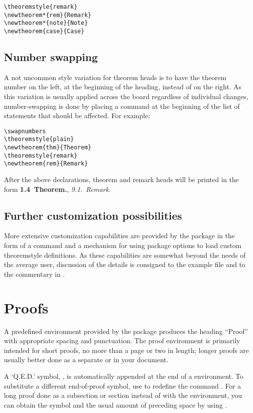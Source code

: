 \documentclass[leqno,titlepage,openany]{amsldoc}
\begin{document}
\begin{verbatim}
\theoremstyle{remark}
\newtheorem*{rem}{Remark}
\newtheorem*{note}{Note}
\newtheorem{case}{Case}
\end{verbatim}

\subsection{Number swapping}

A not uncommon style variation for theorem heads is to have the theorem
number on the left, at the beginning of the heading, instead of on the
right. As this variation is usually applied across the board regardless
of individual  changes, number-swapping is done by
placing a  command at the beginning of the list of
 statements that should be affected. For example:
\begin{verbatim}
\swapnumbers
\theoremstyle{plain}
\newtheorem{thm}{Theorem}
\theoremstyle{remark}
\newtheorem{rem}{Remark}
\end{verbatim}
After the above declarations, theorem and remark heads will be printed
in the form \textbf{1.4~Theorem.}, \textit{9.1.~Remark.}

\subsection{Further customization possibilities}

More extensive customization capabilities are provided by the
 package in the form of a  command and a
mechanism for using package options to load custom theoremstyle
definitions. As these capabilities are somewhat beyond the needs of the
average user, discussion of the details is consigned to the example file
 and to the commentary in .

\section{Proofs}

A predefined  environment provided by the 
package produces the heading ``Proof'' with appropriate spacing and
punctuation. The proof environment is primarily intended for short
proofs, no more than a page or two in length; longer proofs are
usually better done as a separate  or  in
your document.

A `Q.E.D.' symbol, \qedsymbol, is automatically appended at the end of
a  environment. To substitute a different end-of-proof
symbol, use  to redefine the command .
For a long proof done as a subsection or section instead of with the
 environment, you can obtain the symbol and the usual
amount of preceding space by using .
\end{document}
